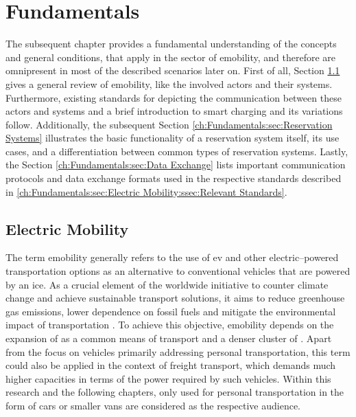 

\chapter{Fundamentals}
\label{ch:Fundamentals}

The subsequent chapter provides a fundamental understanding of the concepts and general conditions, that apply in the sector of \acrshort{emobility}, and therefore are omnipresent in most of the described scenarios later on.
First of all, Section \ref{ch:Fundamentals:sec:Electric Mobility} gives a general review of \acrshort{emobility}, like the involved actors and their systems. Furthermore, existing standards for depicting the communication between these actors and systems and a brief introduction to smart charging and its variations follow.
Additionally, the subsequent Section \ref{ch:Fundamentals:sec:Reservation Systems} illustrates the basic functionality of a reservation system itself, its use cases, and a differentiation between common types of reservation systems.
Lastly, the Section \ref{ch:Fundamentals:sec:Data Exchange} lists important communication protocols and data exchange formats used in the respective standards described in \ref{ch:Fundamentals:sec:Electric Mobility:ssec:Relevant Standards}.

\section{Electric Mobility}
\label{ch:Fundamentals:sec:Electric Mobility}

The term \acrshort{emobility} generally refers to the use of \acrfull{ev} and other electric--powered transportation options as an alternative to conventional vehicles that are powered by an \acrfull{ice}. 
As a crucial element of the worldwide initiative to counter climate change and achieve sustainable transport solutions, it aims to reduce greenhouse gas emissions, lower dependence on fossil fuels and mitigate the environmental impact of transportation \cite{kathiresh_e-mobility_2022}.
To achieve this objective, \acrshort{emobility} depends on the expansion of  as a common means of transport and a denser cluster of .
Apart from the focus on vehicles primarily addressing personal transportation, this term could also be applied in the context of freight transport, which demands much higher capacities in terms of the power required by such vehicles.
Within this research and the following chapters, only  used for personal transportation in the form of cars or smaller vans are considered as the respective audience.

